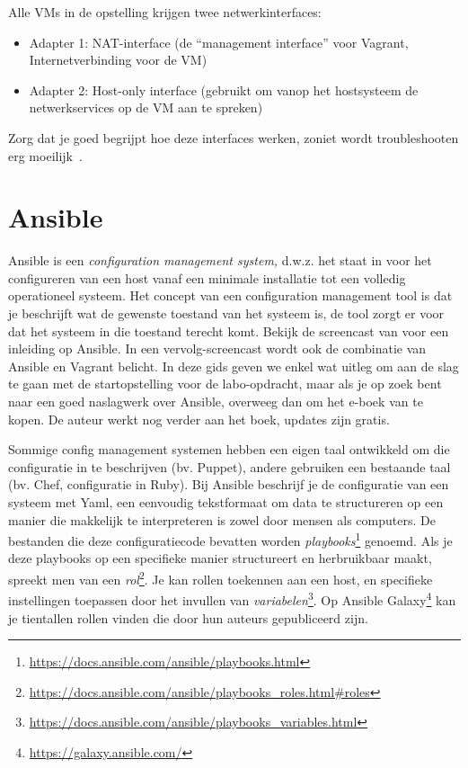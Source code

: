 Alle VMs in de opstelling krijgen twee netwerkinterfaces:

\begin{itemize}
  \item Adapter 1: NAT-interface (de ``management interface'' voor Vagrant, Internetverbinding voor de VM)
  \item Adapter 2: Host-only interface (gebruikt om vanop het hostsysteem de netwerkservices op de VM aan te spreken)
\end{itemize}

Zorg dat je goed begrijpt hoe deze interfaces werken, zoniet wordt troubleshooten erg moeilijk~\autocite{VanVreckem2015a}.

\section{Ansible}
\label{sec:ansible}

Ansible is een \emph{configuration management system,} d.w.z. het staat in voor het configureren van een host vanaf een minimale installatie tot een volledig operationeel systeem. Het concept van een configuration management tool is dat je beschrijft wat de gewenste toestand van het systeem is, de tool zorgt er voor dat het systeem in die toestand terecht komt. Bekijk de screencast van \textcite{Weissig2015} voor een inleiding op Ansible. In een vervolg-screencast wordt ook de combinatie van Ansible en Vagrant belicht. In deze gids geven we enkel wat uitleg om aan de slag te gaan met de startopstelling voor de labo-opdracht, maar als je op zoek bent naar een goed naslagwerk over Ansible, overweeg dan om het e-boek van \textcite{Geerling2016} te kopen. De auteur werkt nog verder aan het boek, updates zijn gratis.

Sommige config management systemen hebben een eigen taal ontwikkeld om die configuratie in te beschrijven (bv. Puppet), andere gebruiken een bestaande taal (bv. Chef, configuratie in Ruby). Bij Ansible beschrijf je de configuratie van een systeem met Yaml, een eenvoudig tekstformaat om data te structureren op een manier die makkelijk te interpreteren is zowel door mensen als computers. De bestanden die deze configuratiecode bevatten worden \emph{playbooks}\footnote{\url{https://docs.ansible.com/ansible/playbooks.html}} genoemd. Als je deze playbooks op een specifieke manier structureert en herbruikbaar maakt, spreekt men van een \emph{rol}\footnote{\url{https://docs.ansible.com/ansible/playbooks_roles.html\#roles}}. Je kan rollen toekennen aan een host, en specifieke instellingen toepassen door het invullen van \emph{variabelen}\footnote{\url{https://docs.ansible.com/ansible/playbooks_variables.html}}. Op Ansible Galaxy\footnote{\url{https://galaxy.ansible.com/}} kan je tientallen rollen vinden die door hun auteurs gepubliceerd zijn.

